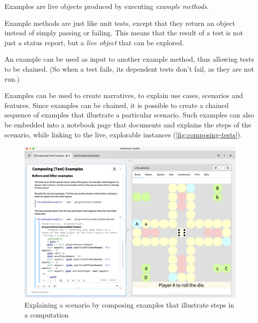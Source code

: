\documentclass[conference]{IEEEtran}
\newcommand\on[1]{\nbc{ON}{#1}{red}} %
\newcommand\tg[1]{\nbc{TG}{#1}{orange}} %
\newcommand{\figlabel}[1]{\label{fig:#1}}
\begin{document}
Examples are live objects produced by executing \emph{example methods}\cite{Gael03c,Gael07a,Girb19a}. 

Example methods are just like unit tests, except that they return an object instead of simply passing or failing.
This means that the result of a test is not just a status report, but a \emph{live object} that can be explored.

An example can be used as input to another example method, thus allowing tests to be chained.
(So when a test fails, its dependent tests don't fail, as they are not run\cite{Kuhn08a}.)

Examples can be used to create narratives, to explain use cases, scenarios and features.
Since examples can be chained, it is possible to create a chained sequence of examples that illustrate a particular scenario.
Such examples can also be embedded into a notebook page that documents and explains the steps of the scenario, while linking to the live, explorable instances (\autoref{fig:composing-tests}).

\begin{figure}[htbp]
  \centering
  \includegraphics[width=\columnwidth]{figures/composing-tests.png}
  \caption{Explaining a scenario by composing examples that illustrate steps in a computation}
  \figlabel{composing-tests}
\end{figure}

\end{document}
